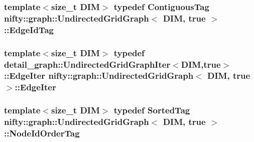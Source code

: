 \subsubsection[{Edge\+Id\+Tag}]{\setlength{\rightskip}{0pt plus 5cm}template$<$size\+\_\+t D\+I\+M$>$ typedef {\bf Contiguous\+Tag} {\bf nifty\+::graph\+::\+Undirected\+Grid\+Graph}$<$ D\+I\+M, true $>$\+::{\bf Edge\+Id\+Tag}}\label{classnifty_1_1graph_1_1UndirectedGridGraph_3_01DIM_00_01true_01_4_a0d9a24c893bf3f5f0cd61873bb77dfe1}
\hypertarget{classnifty_1_1graph_1_1UndirectedGridGraph_3_01DIM_00_01true_01_4_adc2fd416d91079b5450887b0c2c3cf05}{}
\subsubsection[{Edge\+Iter}]{\setlength{\rightskip}{0pt plus 5cm}template$<$size\+\_\+t D\+I\+M$>$ typedef {\bf detail\+\_\+graph\+::\+Undirected\+Grid\+Graph\+Iter}$<$D\+I\+M,true$>$\+::{\bf Edge\+Iter} {\bf nifty\+::graph\+::\+Undirected\+Grid\+Graph}$<$ D\+I\+M, true $>$\+::{\bf Edge\+Iter}}\label{classnifty_1_1graph_1_1UndirectedGridGraph_3_01DIM_00_01true_01_4_adc2fd416d91079b5450887b0c2c3cf05}
\hypertarget{classnifty_1_1graph_1_1UndirectedGridGraph_3_01DIM_00_01true_01_4_accf075c1b2a1820d15eea368562c93aa}{}
\subsubsection[{Node\+Id\+Order\+Tag}]{\setlength{\rightskip}{0pt plus 5cm}template$<$size\+\_\+t D\+I\+M$>$ typedef {\bf Sorted\+Tag} {\bf nifty\+::graph\+::\+Undirected\+Grid\+Graph}$<$ D\+I\+M, true $>$\+::{\bf Node\+Id\+Order\+Tag}}\label{classnifty_1_1graph_1_1UndirectedGridGraph_3_01DIM_00_01true_01_4_accf075c1b2a1820d15eea368562c93aa}
\hypertarget{classnifty_1_1graph_1_1UndirectedGridGraph_3_01DIM_00_01true_01_4_a35ae15ae07ebf58ef26916b417fba878}{}

